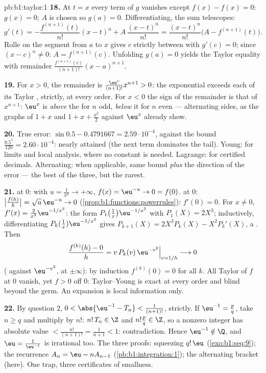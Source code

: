 \begin{solution}{pb:b1:taylor:1}
\textbf{18.} At $t = x$ every term of $g$ vanishes except $f(x)
- f(x) = 0$: $g(x) = 0$; $A$ is chosen so $g(a) = 0$.
Differentiating, the sum telescopes:
\[
g'(t) = -\frac{f^{(n+1)}(t)}{n!}(x - t)^n +
A\,\frac{(x-t)^n}{n!}
= \frac{(x-t)^n}{n!}\bigl(A - f^{(n+1)}(t)\bigr) .
\]
Rolle on the segment from $a$ to $x$ gives $c$ strictly between
with $g'(c) = 0$; since $(x - c)^n \neq 0$: $A =
f^{(n+1)}(c)$. Unfolding $g(a) = 0$ yields the Taylor equality
with remainder $\frac{f^{(n+1)}(c)}{(n+1)!}(x-a)^{n+1}$.

\textbf{19.} For $x > 0$, the remainder is $\frac{\eu^{c}}
{(n+1)!}x^{n+1} > 0$: the exponential exceeds each of its
Taylor , strictly, at every order. For $x < 0$ the
sign of the remainder is that of $x^{n+1}$: $\eu^x$ is
\emph{above} the  for $n$ odd, \emph{below} it for
$n$ even --- alternating sides, as the graphs of $1 + x$ and $1
+ x + \frac{x^2}{2}$ against $\eu^x$ already show.

\textbf{20.} True error: $\sin 0.5 - 0.4791667 =
2.59\cdot10^{-4}$, against the bound $\frac{0.5^5}{120} =
2.60\cdot10^{-4}$: nearly attained (the next term dominates the
tail). Young: for limits and local analysis, where no constant
is needed. Lagrange: for certified decimals. Alternating: when
applicable, same bound \emph{plus} the direction of the error
--- the best of the three, but the rarest.

\textbf{21.}  at $0$: with $u = \frac{1}{x^2} \to
+\infty$, $f(x) = \eu^{-u} \to 0 = f(0)$.  at $0$:
$\bigl|\frac{f(h)}{h}\bigr| = \sqrt u\,\eu^{-u} \to 0$
(\cref{prop:b1:functions:powerrules}): $f'(0) = 0$. For $x \neq
0$, $f'(x) = \frac{2}{x^3}\eu^{-1/x^2}$: the form
$P_1\bigl(\frac1x\bigr)\eu^{-1/x^2}$ with $P_1(X) = 2X^3$;
inductively, differentiating $P_k(\frac1x)\eu^{-1/x^2}$ gives
$P_{k+1}(X) = 2X^3 P_k(X) - X^2 P_k'(X)$, a . Then
\[
\frac{f^{(k)}(h) - 0}{h} = v\,P_k(v)\,\eu^{-v^2}
\Big|_{v = 1/h} \longrightarrow 0
\]
( against $\eu^{-v^2}$,  at
$\pm\infty$): by induction $f^{(k)}(0) = 0$ for all $k$. All
Taylor  of $f$ at $0$ vanish, yet $f > 0$ off $0$:
Taylor--Young is exact at every order and blind beyond the
germ. An expansion is local information only.

\textbf{22.} By question 2, $0 < \abs{\eu^{-1} - T_n} <
\frac{1}{(n+1)!}$, strictly. If $\eu^{-1} = \frac pq$, take $n
\geq q$ and multiply by $n!$: $n!\,T_n \in \Z$ and $n!\frac pq
\in \Z$, so a nonzero integer has absolute value $<
\frac{n!}{(n+1)!} = \frac{1}{n+1} < 1$: contradiction. Hence
$\eu^{-1} \notin \Q$, and $\eu = \frac{1}{\eu^{-1}}$ is
irrational too. The three proofs:  squeezing
$q!\,\eu$ (\cref{exo:b1:seq:9}); the  recurrence $A_n =
\eu - nA_{n-1}$ (\cref{pb:b1:integration:1}); the alternating
bracket (here). One trap, three certificates of smallness.


\end{solution}
